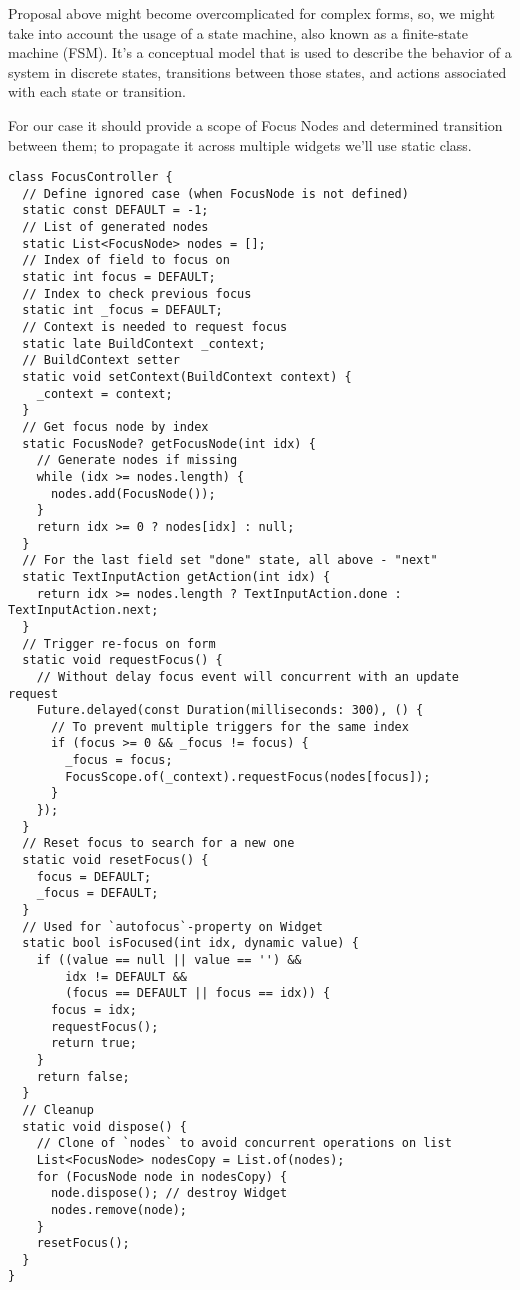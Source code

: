 Proposal above might become overcomplicated for complex forms, so, we might take into account the usage of a state 
machine, also known as a finite-state machine (FSM). It's a conceptual model that is used to describe the behavior of a 
system in discrete states, transitions between those states, and actions associated with each state or transition.

For our case it should provide a scope of Focus Nodes and determined transition between them; to propagate it across
multiple widgets we'll use static class.

\begin{lstlisting}
class FocusController {
  // Define ignored case (when FocusNode is not defined)
  static const DEFAULT = -1;
  // List of generated nodes
  static List<FocusNode> nodes = [];
  // Index of field to focus on
  static int focus = DEFAULT;
  // Index to check previous focus
  static int _focus = DEFAULT;
  // Context is needed to request focus
  static late BuildContext _context;
  // BuildContext setter
  static void setContext(BuildContext context) {
    _context = context;
  }
  // Get focus node by index
  static FocusNode? getFocusNode(int idx) {
    // Generate nodes if missing
    while (idx >= nodes.length) {
      nodes.add(FocusNode());
    }
    return idx >= 0 ? nodes[idx] : null;
  }
  // For the last field set "done" state, all above - "next"
  static TextInputAction getAction(int idx) {
    return idx >= nodes.length ? TextInputAction.done : TextInputAction.next;
  }
  // Trigger re-focus on form
  static void requestFocus() {
    // Without delay focus event will concurrent with an update request
    Future.delayed(const Duration(milliseconds: 300), () {
      // To prevent multiple triggers for the same index
      if (focus >= 0 && _focus != focus) {
        _focus = focus;
        FocusScope.of(_context).requestFocus(nodes[focus]);
      }
    });
  }
  // Reset focus to search for a new one
  static void resetFocus() {
    focus = DEFAULT;
    _focus = DEFAULT;
  }
  // Used for `autofocus`-property on Widget
  static bool isFocused(int idx, dynamic value) {
    if ((value == null || value == '') &&
        idx != DEFAULT &&
        (focus == DEFAULT || focus == idx)) {
      focus = idx;
      requestFocus();
      return true;
    }
    return false;
  }
  // Cleanup
  static void dispose() {
    // Clone of `nodes` to avoid concurrent operations on list
    List<FocusNode> nodesCopy = List.of(nodes);
    for (FocusNode node in nodesCopy) {
      node.dispose(); // destroy Widget
      nodes.remove(node);
    }
    resetFocus();
  }
}
\end{lstlisting}

